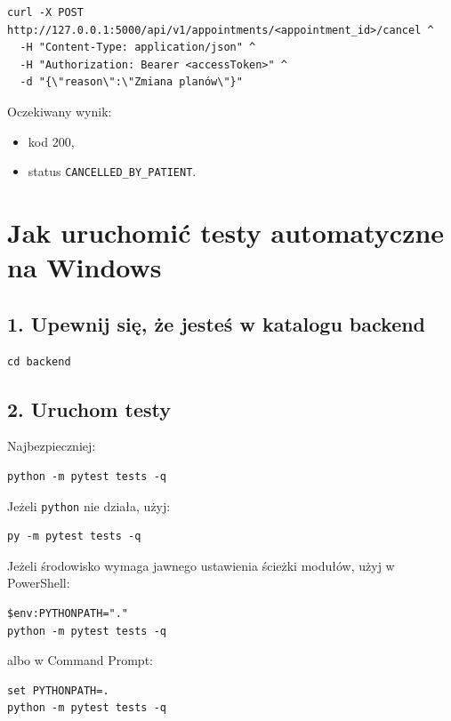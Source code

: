 \documentclass[11pt,a4paper]{article}
\begin{document}
\begin{lstlisting}
curl -X POST http://127.0.0.1:5000/api/v1/appointments/<appointment_id>/cancel ^
  -H "Content-Type: application/json" ^
  -H "Authorization: Bearer <accessToken>" ^
  -d "{\"reason\":\"Zmiana planów\"}"
\end{lstlisting}

Oczekiwany wynik:
\begin{itemize}[leftmargin=1.2cm]
    \item kod 200,
    \item status \texttt{CANCELLED\_BY\_PATIENT}.
\end{itemize}

\section{Jak uruchomić testy automatyczne na Windows}

\subsection{1. Upewnij się, że jesteś w katalogu backend}

\begin{lstlisting}
cd backend
\end{lstlisting}

\subsection{2. Uruchom testy}

Najbezpieczniej:

\begin{lstlisting}
python -m pytest tests -q
\end{lstlisting}

Jeżeli \texttt{python} nie działa, użyj:

\begin{lstlisting}
py -m pytest tests -q
\end{lstlisting}

Jeżeli środowisko wymaga jawnego ustawienia ścieżki modułów, użyj w PowerShell:

\begin{lstlisting}
$env:PYTHONPATH="."
python -m pytest tests -q
\end{lstlisting}

albo w Command Prompt:

\begin{lstlisting}
set PYTHONPATH=.
python -m pytest tests -q
\end{lstlisting}
\end{document}

